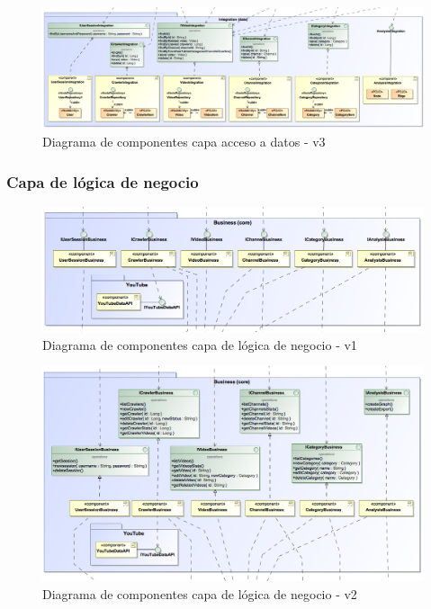 \documentclass[11pt,a4paper]{article}
\begin{document}
\begin{figure}[H]
\centering
\includegraphics[scale=0.25]{diseno/accesoDatos/ComponentDiagram3.png}
\caption{Diagrama de componentes capa acceso a datos - v3}
\end{figure}

\medskip 

\subsubsection{Capa de lógica de negocio}

\begin{figure}[H]
\centering
\includegraphics[scale=0.35]{diseno/negocio/ComponentsDiagram.png}
\caption{Diagrama de componentes capa de lógica de negocio - v1}
\end{figure}

\begin{figure}[H]
\centering
\includegraphics[scale=0.3]{diseno/negocio/ComponentDiagram2.png}
\caption{Diagrama de componentes capa de lógica de negocio - v2}
\end{figure}
\end{document}
